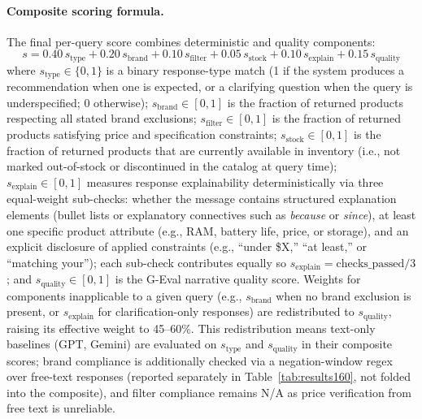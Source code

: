 \documentclass[sigconf,anonymous]{acmart}
\begin{document}
\paragraph{Composite scoring formula.}
The final per-query score combines deterministic and quality components:
\begin{equation}
  s = 0.40\,s_{\text{type}} + 0.20\,s_{\text{brand}} + 0.10\,s_{\text{filter}}
    + 0.05\,s_{\text{stock}} + 0.10\,s_{\text{explain}} + 0.15\,s_{\text{quality}}
  \label{eq:geval}
\end{equation}
where $s_{\text{type}} \in \{0,1\}$ is a binary response-type match
(1 if the system produces a recommendation when one is expected, or a
clarifying question when the query is underspecified; 0 otherwise);
$s_{\text{brand}} \in [0,1]$ is the fraction of returned products respecting
all stated brand exclusions;
$s_{\text{filter}} \in [0,1]$ is the fraction of returned products satisfying
price and specification constraints;
$s_{\text{stock}} \in [0,1]$ is the fraction of returned products that are
currently available in inventory (i.e., not marked out-of-stock or
discontinued in the catalog at query time);
$s_{\text{explain}} \in [0,1]$ measures response explainability deterministically
via three equal-weight sub-checks: whether the message contains structured
explanation elements (bullet lists or explanatory connectives such as
\emph{because} or \emph{since}), at least one specific product attribute
(e.g., RAM, battery life, price, or storage), and an explicit disclosure of
applied constraints (e.g., ``under \$X,'' ``at least,'' or ``matching your'');
each sub-check contributes equally so
$s_{\text{explain}} = \text{checks\_passed} / 3$;
and $s_{\text{quality}} \in [0,1]$ is the G-Eval narrative quality score.
Weights for components inapplicable to a given query (e.g., $s_{\text{brand}}$
when no brand exclusion is present, or $s_{\text{explain}}$ for
clarification-only responses) are redistributed to $s_{\text{quality}}$,
raising its effective weight to 45--60\%.
This redistribution means text-only baselines (GPT, Gemini) are evaluated
on $s_{\text{type}}$ and $s_{\text{quality}}$ in their composite scores;
brand compliance is additionally checked via a negation-window regex over
free-text responses (reported separately in Table~\ref{tab:results160},
not folded into the composite), and filter compliance remains N/A as
price verification from free text is unreliable.
\end{document}
